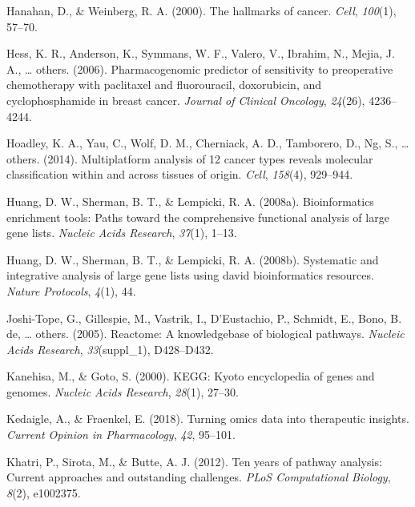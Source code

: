 \documentclass[12pt,twoside]{reedthesis}
\begin{document}
\leavevmode\hypertarget{ref-hanahan2000hallmarks}{}%
Hanahan, D., \& Weinberg, R. A. (2000). The hallmarks of cancer. \emph{Cell}, \emph{100}(1), 57--70.

\leavevmode\hypertarget{ref-hess2006pharmacogenomic}{}%
Hess, K. R., Anderson, K., Symmans, W. F., Valero, V., Ibrahim, N., Mejia, J. A., \ldots{} others. (2006). Pharmacogenomic predictor of sensitivity to preoperative chemotherapy with paclitaxel and fluorouracil, doxorubicin, and cyclophosphamide in breast cancer. \emph{Journal of Clinical Oncology}, \emph{24}(26), 4236--4244.

\leavevmode\hypertarget{ref-hoadley2014multiplatform}{}%
Hoadley, K. A., Yau, C., Wolf, D. M., Cherniack, A. D., Tamborero, D., Ng, S., \ldots{} others. (2014). Multiplatform analysis of 12 cancer types reveals molecular classification within and across tissues of origin. \emph{Cell}, \emph{158}(4), 929--944.

\leavevmode\hypertarget{ref-huang2008bioinformatics}{}%
Huang, D. W., Sherman, B. T., \& Lempicki, R. A. (2008a). Bioinformatics enrichment tools: Paths toward the comprehensive functional analysis of large gene lists. \emph{Nucleic Acids Research}, \emph{37}(1), 1--13.

\leavevmode\hypertarget{ref-huang2008systematic}{}%
Huang, D. W., Sherman, B. T., \& Lempicki, R. A. (2008b). Systematic and integrative analysis of large gene lists using david bioinformatics resources. \emph{Nature Protocols}, \emph{4}(1), 44.

\leavevmode\hypertarget{ref-joshi2005reactome}{}%
Joshi-Tope, G., Gillespie, M., Vastrik, I., D'Eustachio, P., Schmidt, E., Bono, B. de, \ldots{} others. (2005). Reactome: A knowledgebase of biological pathways. \emph{Nucleic Acids Research}, \emph{33}(suppl\_1), D428--D432.

\leavevmode\hypertarget{ref-kanehisa2000kegg}{}%
Kanehisa, M., \& Goto, S. (2000). KEGG: Kyoto encyclopedia of genes and genomes. \emph{Nucleic Acids Research}, \emph{28}(1), 27--30.

\leavevmode\hypertarget{ref-kedaigle2018turning}{}%
Kedaigle, A., \& Fraenkel, E. (2018). Turning omics data into therapeutic insights. \emph{Current Opinion in Pharmacology}, \emph{42}, 95--101.

\leavevmode\hypertarget{ref-khatri2012ten}{}%
Khatri, P., Sirota, M., \& Butte, A. J. (2012). Ten years of pathway analysis: Current approaches and outstanding challenges. \emph{PLoS Computational Biology}, \emph{8}(2), e1002375.
\end{document}
